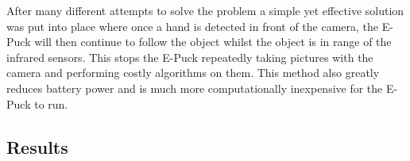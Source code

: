 After many different attempts to solve the problem a simple yet effective solution was put into place where once a hand is detected in front of the camera, the E-Puck will then continue to follow the object whilst the object is in range of the infrared sensors. This stops the E-Puck repeatedly taking pictures with the camera and performing costly algorithms on them. This method also greatly reduces battery power and is much more computationally inexpensive for the E-Puck to run.

\subsection{Results}

